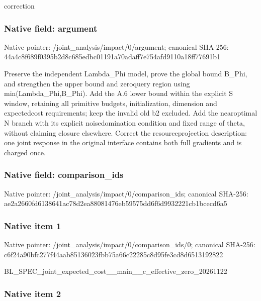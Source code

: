 \documentclass[10pt,a4paper]{article}
\begin{document}
correction


\subsubsection{Native field: argument}


Native pointer: /joint\_analysis/impact/0/argument; canonical SHA-256: 44a4c8f689f0395b2d8c685e\allowbreak{}dbc01191a70adaff7e754afd\allowbreak{}9110a18ff77691b1


Preserve the independent Lambda\_Phi model, prove the global bound B\_Phi, and strengthen the upper bound and zeroquery region using min(Lambda\_Phi,B\_Phi). Add the A.6 lower bound within the explicit S window, retaining all primitive budgets, initialization, dimension and expectedcost requirements; keep the invalid old b2 excluded. Add the nearoptimal N branch with its explicit noisedomination condition and fixed range of theta, without claiming closure elsewhere. Correct the resourceprojection description: one joint response in the original interface contains both full gradients and is charged once.


\subsubsection{Native field: comparison\_ids}


Native pointer: /joint\_analysis/impact/0/comparison\_ids; canonical SHA-256: ae2a2660fd6138641ac78d2e\allowbreak{}a88081476eb59575dd6f6d99\allowbreak{}32221cb1bcecd6a5



\subsubsection{Native item 1}


Native pointer: /joint\_analysis/impact/0\allowbreak{}/comparison\_ids/0; canonical SHA-256: c6f24a90bfc277f44aab8513\allowbreak{}6023fbb75a66c22285c8d95f\allowbreak{}e3cd8d6513192822


BL\_SPEC\_joint\_expected\_c\allowbreak{}ost\_\_main\_\_c\_effective\_z\allowbreak{}ero\_20261122


\subsubsection{Native item 2}
\end{document}

